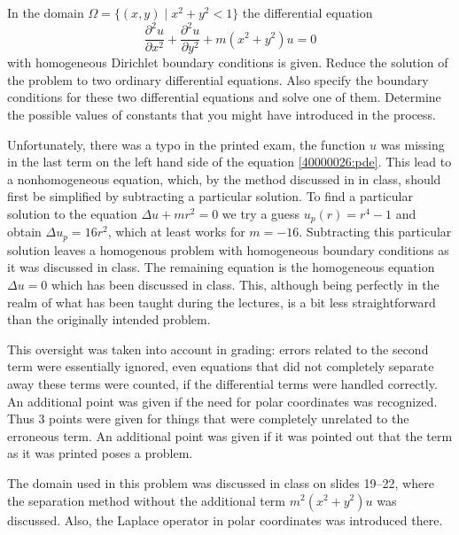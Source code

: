 In the domain $\Omega=\{(x,y)\mid x^2+y^2<1\}$ the differential equation
\begin{equation}
\frac{\partial^2u}{\partial x^2} + \frac{\partial^2 u}{\partial y^2}
+m(x^2+y^2)u=0
\label{40000026:pde}
\end{equation}
with homogeneous Dirichlet boundary conditions is given.
Reduce the solution of the problem to two ordinary differential 
equations.
Also specify the boundary conditions for these two differential equations
and solve one of them.
Determine the possible values of constants that you might have introduced
in the process.

\begin{diskussion}
Unfortunately, there was a typo in the printed exam, the function $u$
was missing in the last term on the left hand side of the equation
\eqref{40000026:pde}.
This lead to a nonhomogeneous equation, which, by the method discussed
in in class, should first be simplified by subtracting a particular
solution.
To find a particular solution to the equation $\Delta u+mr^2=0$ we try
a guess $u_p(r)=r^4-1$ and obtain $\Delta u_p=16r^2$, which at least
works for $m=-16$.
Subtracting this particular solution leaves a homogenous problem with
homogeneous boundary conditions as it was discussed in class.
The remaining equation is the homogeneous equation $\Delta u=0$ which has
been discussed in class.
This, although being perfectly in the realm of what has been taught
during the lectures, is a bit less straightforward than the originally 
intended problem.

This oversight was taken into account in grading: errors related to the
second term were essentially ignored, even equations that did not completely
separate away these terms were counted, if the differential terms were
handled correctly.
An additional point was given if the need for polar coordinates was 
recognized.
Thus 3 points were given for things that were completely unrelated
to the erroneous term.
An additional point was given if it was pointed out that the term
as it was printed poses a problem.

The domain used in this problem was discussed in class on slides 19--22,
where the separation method without the additional term $m^2(x^2+y^2)u$
was discussed.
Also, the Laplace operator in polar coordinates was introduced there.
\end{diskussion}

